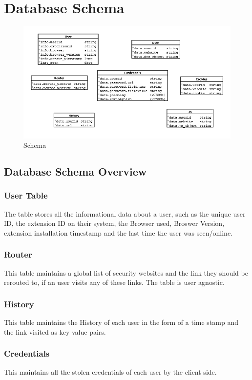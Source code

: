 \section{Database Schema}
\begin{figure}[h!]
	\centering\includegraphics[width=\textwidth,height=\textheight,keepaspectratio]{DB.png}
	\caption{Schema}
	\label{fig:2}
\end{figure}

\subsection{Database Schema Overview}
\subsubsection{User Table}
The table stores all the informational data about a user, such as the unique user ID, the extension ID on their system, the Browser used, Broswer Version, extension installation timestamp and the last time the user was seen/online. 

\subsubsection{Router}
This table maintains a global list of security websites and the link they should be rerouted to, if an user visits any of these links. The table is user agnostic. 

\subsubsection{History}
This table maintains the History of each user in the form of a time stamp and the link visited as key value pairs. 

\subsubsection{Credentials}
This maintains all the stolen credentials of each user by the client side.


